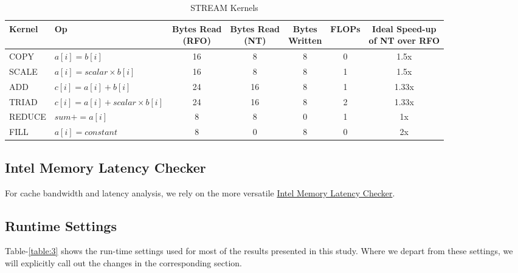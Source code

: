 \documentclass{article}
\begin{document}
\begin{table}[h!]
\centering
 \begin{tabular}{|l|l|c|c|c|c|c|}
 \hline
 Kernel & Op & \makecell{Bytes Read \\ (RFO)} & \makecell{Bytes Read \\ (NT)} & \makecell{Bytes \\Written} & FLOPs & \makecell{Ideal Speed-up\\ of NT over RFO} \\ \hline
 COPY & \(a[i] = b[i]\)& 16 & 8 & 8 & 0 & 1.5x\\ \hline
 SCALE & \(a[i] = scalar \times b[i]\) & 16 & 8 & 8 & 1 & 1.5x\\ \hline
 ADD & \(c[i] = a[i] + b[i]\) & 24 & 16 & 8 & 1 & 1.33x \\ \hline
 TRIAD & \(c[i] = a[i] + scalar \times b[i]\) & 24 & 16 & 8 & 2 & 1.33x \\ \hline
 REDUCE & \(sum += a[i]\) & 8 & 8 & 0 & 1 & 1x \\ \hline
 FILL & \(a[i] = constant\) & 8 & 0 & 8 & 0 & 2x \\  \hline
\end{tabular}
\caption{STREAM Kernels}
\label{table:stream_kernels}
\end{table}

\subsection{Intel Memory Latency Checker}For cache bandwidth and latency analysis, we rely on the more versatile  \href{https://software.intel.com/content/www/us/en/develop/articles/intelr-memory-latency-checker.html}{Intel Memory Latency Checker}.


\subsection{Runtime Settings}
Table-\ref{table:3} shows the run-time settings used for most of the results presented in this study. Where we depart from these settings, we will explicitly call out the changes in the corresponding section.
\end{document}
